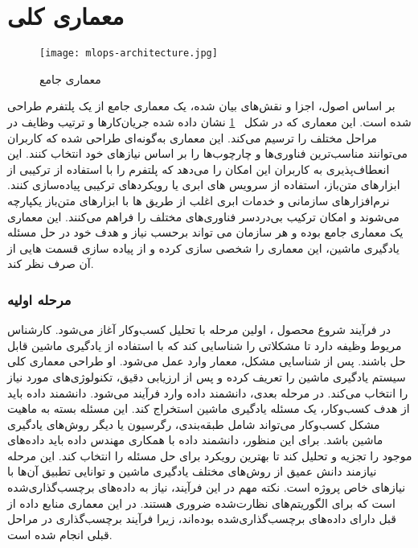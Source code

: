 \section{معماری کلی}
\begin{figure}[!b]
	\centering
	\texttt{[image: mlops-architecture.jpg]}
	\caption{معماری جامع }
	\label{fig: mlops architecture}
\end{figure}
بر اساس اصول، اجزا و نقش‌های بیان شده، یک معماری جامع از یک پلتفرم  طراحی شده است. این معماری که در شکل 
~\ref{fig: mlops architecture}
 نشان داده شده جریان‌کارها و ترتیب وظایف در مراحل مختلف را ترسیم می‌کند. این معماری به‌گونه‌ای طراحی شده که کاربران می‌توانند مناسب‌ترین فناوری‌ها و چارچوب‌ها را بر اساس نیازهای خود انتخاب کنند. این انعطاف‌پذیری به کاربران این امکان را می‌دهد که پلتفرم  را با استفاده از ترکیبی از ابزارهای متن‌باز، استفاده از سرویس های ابری  یا رویکردهای ترکیبی پیاده‌سازی کنند. نرم‌افزارهای سازمانی و خدمات ابری اغلب از طریق ‌ها با ابزارهای متن‌باز یکپارچه می‌شوند و امکان ترکیب بی‌دردسر فناوری‌های مختلف را فراهم می‌کنند. این معماری یک معماری جامع بوده و هر سازمان می تواند برحسب نیاز و هدف خود در حل مسئله یادگیری ماشین، این معماری را شخصی سازی کرده و از پیاده سازی قسمت هایی از آن صرف نظر کند.

\subsubsection{مرحله اولیه}
در فرآیند شروع محصول ، اولین مرحله با تحلیل کسب‌وکار آغاز می‌شود. کارشناس مریوط وظیفه دارد تا مشکلاتی را شناسایی کند که با استفاده از یادگیری ماشین قابل حل باشند. پس از شناسایی مشکل، معمار وارد عمل می‌شود. او طراحی معماری کلی سیستم یادگیری ماشین را تعریف کرده و پس از ارزیابی دقیق، تکنولوژی‌های مورد نیاز را انتخاب می‌کند. در مرحله بعدی، دانشمند داده وارد فرآیند می‌شود. دانشمند داده باید از هدف کسب‌وکار، یک مسئله یادگیری ماشین استخراج کند. این مسئله بسته به ماهیت مشکل کسب‌وکار می‌تواند شامل طبقه‌بندی، رگرسیون یا دیگر روش‌های یادگیری ماشین باشد. برای این منظور، دانشمند داده با همکاری مهندس داده باید داده‌های موجود را تجزیه و تحلیل کند تا بهترین رویکرد برای حل مسئله را انتخاب کند. این مرحله نیازمند دانش عمیق از روش‌های مختلف یادگیری ماشین و توانایی تطبیق آن‌ها با نیازهای خاص پروژه است. نکته مهم در این فرآیند، نیاز به داده‌های برچسب‌گذاری‌شده است که برای الگوریتم‌های نظارت‌شده ضروری هستند. در این معماری منابع داده از قبل دارای داده‌های برچسب‌گذاری‌شده بوده‌اند، زیرا فرآیند برچسب‌گذاری در مراحل قبلی انجام شده است.

